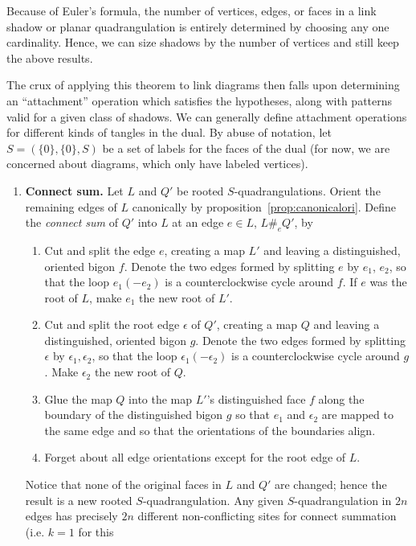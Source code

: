 \documentclass[amsmath,longbibliography,secnumarabic,floatfix,amssymb,nofootinbib,nobibnotes,letterpaper,11pt,notitlepage,tightenlines]{revtex4-1}
\begin{document}
Because of Euler's formula, the number of vertices, edges, or faces in a link shadow or planar
quadrangulation is entirely determined by choosing any one cardinality. Hence, we can size shadows
by the number of vertices and still keep the above results.

The crux of applying this theorem to link diagrams then falls upon
determining an ``attachment'' operation which satisfies the
hypotheses, along with patterns valid for a given class of shadows.
We can generally define attachment operations for different kinds of
tangles in the dual. By abuse of notation, let $S = (\{0\}, \{0\}, S)$ be a set of
labels for the faces of the dual (for now, we are concerned about
diagrams, which only have labeled vertices).
\begin{enumerate}
\item \textbf{Connect sum.} Let $L$ and $Q'$ be rooted $S$-quadrangulations. Orient the
  remaining edges of $L$ canonically by proposition~\ref{prop:canonicalori}. Define the
  \emph{connect sum} of $Q'$ into $L$ at an edge $e \in L$, $L \#_e Q'$, by
  \begin{enumerate}
  \item Cut and split the edge $e$, creating a map $L'$ and leaving a distinguished, oriented bigon
    $f$. Denote the two edges formed by splitting $e$ by $e_1$, $e_2$, so that the loop $e_1(-e_2)$
    is a counterclockwise cycle around $f$. If $e$ was the root of $L$, make $e_1$ the new root of
    $L'$.
  \item Cut and split the root edge $\epsilon$ of $Q'$, creating a map $Q$ and leaving a
    distinguished, oriented bigon $g$. Denote the two edges formed by splitting $\epsilon$ by
    $\epsilon_1, \epsilon_2$, so that the loop $\epsilon_1(-\epsilon_2)$ is a counterclockwise cycle
    around $g$. Make $\epsilon_2$ the new root of $Q$.
  \item Glue the map $Q$ into the map $L'$'s distinguished face $f$ along the boundary of the
    distinguished bigon $g$ so that $e_1$ and $\epsilon_2$ are mapped to the same edge and so that
    the orientations of the boundaries align.
  \item Forget about all edge orientations except for the root edge of $L$.
  \end{enumerate} Notice that none of the original faces in $L$ and $Q'$ are changed; hence the
  result is a new rooted $S$-quadrangulation. Any given $S$-quadrangulation in $2n$ edges
  has precisely $2n$ different non-conflicting sites for connect summation (i.e. $k = 1$ for this

\end{enumerate}
\end{document}

